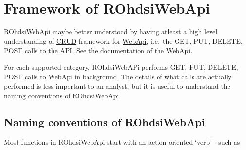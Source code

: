 \documentclass[
]{article}
\begin{document}
\hypertarget{framework-of-rohdsiwebapi}{%
\section{Framework of ROhdsiWebApi}\label{framework-of-rohdsiwebapi}}

ROhdsiWebApi maybe better understood by having atleast a high level
understanding of
\href{https://en.wikipedia.org/wiki/Create,_read,_update_and_delete}{CRUD}
framework for \href{https://github.com/ohdsi/webapi}{WebApi}, i.e.~the
GET, PUT, DELETE, POST calls to the API. See
\href{http://webapidoc.ohdsi.org/index.html}{the documentation of the
WebApi}.

For each supported category, ROhdsiWebAPi performs GET, PUT, DELETE,
POST calls to WebApi in background. The details of what calls are
actually performed is less important to an analyst, but it is useful to
understand the naming conventions of ROhdsiWebApi.

\hypertarget{naming-conventions-of-rohdsiwebapi}{%
\subsection{Naming conventions of
ROhdsiWebApi}\label{naming-conventions-of-rohdsiwebapi}}

Most functions in ROhdsiWebApi start with an action oriented `verb' -
such as
\end{document}
